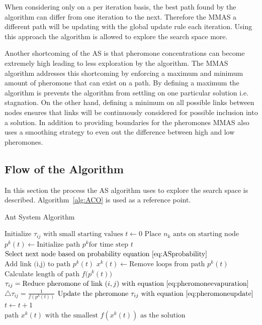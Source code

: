 When considering only on a per iteration basis, the best path found by the algorithm can differ from one iteration to the next\cite{FundamentalSwarm}. Therefore the \gls{MMAS} a different path will be updating with the global update rule each iteration\cite{FundamentalSwarm}. Using this approach the algorithm is allowed to explore the search space more\cite{FundamentalSwarm}.

Another shortcoming of the \gls{AS} is that pheromone concentrations can become extremely high leading to less exploration by the algorithm\cite{FundamentalSwarm}. The \gls{MMAS} algorithm addresses this shortcoming by enforcing a maximum and minimum amount of pheromone that can exist on a path\cite{FundamentalSwarm}. By defining a maximum the algorithm is prevents the algorithm from settling on one particular solution i.e. stagnation\cite{FundamentalSwarm}. On the other hand, defining a minimum on all possible links between nodes ensures that links will be continuously considered for possible inclusion into a solution\cite{FundamentalSwarm}. In addition to providing boundaries for the pheromones \gls{MMAS} also uses a smoothing strategy to even out the difference between high and low pheromones\cite{FundamentalSwarm}.

\subsection{Flow of the Algorithm}
In this section the process the \gls{AS} algorithm uses to explore the search space is described. Algorithm~\ref{alg:ACO} is used as a reference point.
\begin{algorithm}[H]
\caption{Ant System Algorithm~\cite{CompuIntelligenceIntro}}
\label{alg:ACO}
	\begin{algorithmic}[1]
	\State$\text{Initialize $\tau_{ij}$ with small starting values}$
	\State$t \leftarrow 0$
	\State$\text{Place $n_k$ ants on starting node}$
			\State$p^k(t) \leftarrow \text{Initialize path } p^k \text{for time step } t$
			\Repeat
				\State$\text{Select next node based on probability equation~\ref{eq:ASprobability}}$
				\State$\text{Add link (i,j) to path } p^k(t)$
			\State$x^k(t) \leftarrow \text{Remove loops from path }p^k(t)$
			\State$\text{Calculate length of path $f(p^k(t)$})$
		\EndFor
			\State$\tau_{ij} = \text{Reduce pheromone of link $(i,j)$ with equation~\ref{eq:pheromoneevapuration}}$
		\EndFor
				\State$\triangle \tau_{ij} = \frac{1}{f(p^k(t))}$
				\State$\text{Update the pheromone $\tau_{ij}$ with equation~\ref{eq:pheromoneupdate}}$
			\EndFor
		\EndFor
		\State$t \leftarrow t + 1$
	\EndWhile\\
	\Return $\text{path $x^k(t)$ with the smallest $f(x^k(t))$ as the solution}$
	\end{algorithmic}
\end{algorithm}

